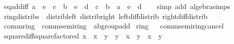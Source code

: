 \begin{isabellebody}
\endisatagproof
{\isafoldproof}%
%
\isadelimproof
\isanewline
%
\endisadelimproof
\isanewline
{}\isamarkupfalse%
\ eq{\isacharunderscore}{\kern0pt}add{\isacharunderscore}{\kern0pt}iff{}{\isacharcolon}{\kern0pt}\ {\isachardoublequoteopen}a\ {\isacharasterisk}{\kern0pt}\ e\ {\isacharplus}{\kern0pt}\ c\ {\isacharequal}{\kern0pt}\ b\ {\isacharasterisk}{\kern0pt}\ e\ {\isacharplus}{\kern0pt}\ d\ {\isasymlongleftrightarrow}\ c\ {\isacharequal}{\kern0pt}\ {\isacharparenleft}{\kern0pt}b\ {\isacharminus}{\kern0pt}\ a{\isacharparenright}{\kern0pt}\ {\isacharasterisk}{\kern0pt}\ e\ {\isacharplus}{\kern0pt}\ d{\isachardoublequoteclose}\isanewline
%
\isadelimproof
\ \ %
\endisadelimproof
%
\isatagproof
{}\isamarkupfalse%
\ {\isacharparenleft}{\kern0pt}simp\ add{\isacharcolon}{\kern0pt}\ algebra{\isacharunderscore}{\kern0pt}simps{\isacharparenright}{\kern0pt}%
\endisatagproof
{\isafoldproof}%
%
\isadelimproof
\isanewline
%
\endisadelimproof
\isanewline
{}\isamarkupfalse%
\isanewline
\isanewline
{}\isamarkupfalse%
\ ring{\isacharunderscore}{\kern0pt}distribs\ {\isacharequal}{\kern0pt}\ distrib{\isacharunderscore}{\kern0pt}left\ distrib{\isacharunderscore}{\kern0pt}right\ left{\isacharunderscore}{\kern0pt}diff{\isacharunderscore}{\kern0pt}distrib\ right{\isacharunderscore}{\kern0pt}diff{\isacharunderscore}{\kern0pt}distrib\isanewline
\isanewline
{}\isamarkupfalse%
\ comm{\isacharunderscore}{\kern0pt}ring\ {\isacharequal}{\kern0pt}\ comm{\isacharunderscore}{\kern0pt}semiring\ {\isacharplus}{\kern0pt}\ ab{\isacharunderscore}{\kern0pt}group{\isacharunderscore}{\kern0pt}add\isanewline
{}\isanewline
\isanewline
{}\isamarkupfalse%
\ ring%
\isadelimproof
\ %
\endisadelimproof
%
\isatagproof
\isacommand{{\isachardot}{\kern0pt}{\isachardot}{\kern0pt}}\isamarkupfalse%
%
\endisatagproof
{\isafoldproof}%
%
\isadelimproof
%
\endisadelimproof
\isanewline
{}\isamarkupfalse%
\ comm{\isacharunderscore}{\kern0pt}semiring{\isacharunderscore}{\kern0pt}{}{\isacharunderscore}{\kern0pt}cancel%
\isadelimproof
\ %
\endisadelimproof
%
\isatagproof
\isacommand{{\isachardot}{\kern0pt}{\isachardot}{\kern0pt}}\isamarkupfalse%
%
\endisatagproof
{\isafoldproof}%
%
\isadelimproof
%
\endisadelimproof
\isanewline
\isanewline
{}\isamarkupfalse%
\ square{\isacharunderscore}{\kern0pt}diff{\isacharunderscore}{\kern0pt}square{\isacharunderscore}{\kern0pt}factored{\isacharcolon}{\kern0pt}\ {\isachardoublequoteopen}x\ {\isacharasterisk}{\kern0pt}\ x\ {\isacharminus}{\kern0pt}\ y\ {\isacharasterisk}{\kern0pt}\ y\ {\isacharequal}{\kern0pt}\ {\isacharparenleft}{\kern0pt}x\ {\isacharplus}{\kern0pt}\ y{\isacharparenright}{\kern0pt}\ {\isacharasterisk}{\kern0pt}\ {\isacharparenleft}{\kern0pt}x\ {\isacharminus}{\kern0pt}\ y{\isacharparenright}{\kern0pt}{\isachardoublequoteclose}\isanewline

\end{isabellebody}
